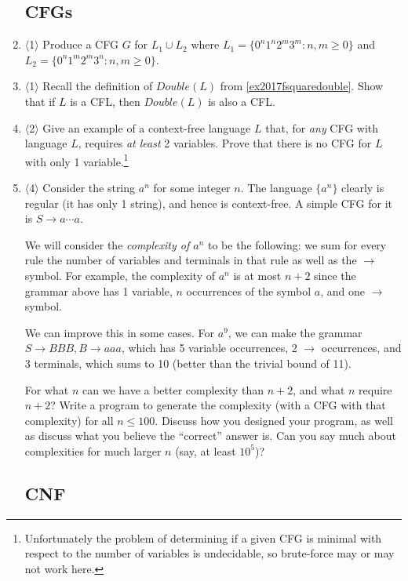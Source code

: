 \documentclass[a4paper,american,12pt]{book}
\newcommand{\Level}[1]{{\color{blue} $\langle$#1$\rangle$}}
\begin{document}
\begin{enumerate}
\subsection{CFGs}

\item \label{summer_2017_cfg} \Level{1} Produce a CFG $G$ for $L_1 \cup L_2$ where $L_1 = \{0^n 1^n 2^m 3^m : n,m \ge 0 \}$ and $L_2 = \{0^n 1^m 2^m 3^n : n, m \ge 0 \}$.

\item \Level{1} Recall the definition of $Double(L)$ from \cref{ex2017fsquaredouble}. Show that if $L$ is a CFL, then $Double(L)$ is also a CFL.

\item \Level{2} Give an example of a context-free language $L$ that, for \emph{any} CFG with language $L$, requires \emph{at least} 2 variables. 
Prove that there is no CFG for $L$ with only 1 variable.\footnote{Unfortunately the problem of determining if a given CFG is minimal with respect to the number of variables is undecidable, so brute-force may or may not work here.}

\item \Level{4} Consider the string $a^n$ for some integer $n$. The language $\{a^n\}$ clearly is regular (it has only 1 string), and hence is context-free. A simple CFG for it is $S \to a\cdots a$. 

We will consider the \emph{complexity of $a^n$} to be the following: we sum for every rule the number of variables and terminals in that rule as well as the $\to$ symbol. For example, the complexity of $a^n$ is at most $n+2$ since the grammar above has 1 variable, $n$ occurrences of the symbol $a$, and one $\to$ symbol.

We can improve this in some cases. For $a^9$, we can make the grammar $S \to BBB, B \to aaa$, which has 5 variable occurrences, 2 $\to$ occurrences, and 3 terminals, which sums to 10 (better than the trivial bound of 11).

For what $n$ can we have a better complexity than $n+2$, and what $n$ require $n+2$?
Write a program to generate the complexity (with a CFG with that complexity) for all $n \le 100$. 
Discuss how you designed your program, as well as discuss what you believe the ``correct'' answer is. 
Can you say much about complexities for much larger $n$ (say, at least $10^5$)?

\subsection{CNF}


\end{enumerate}
\end{document}
